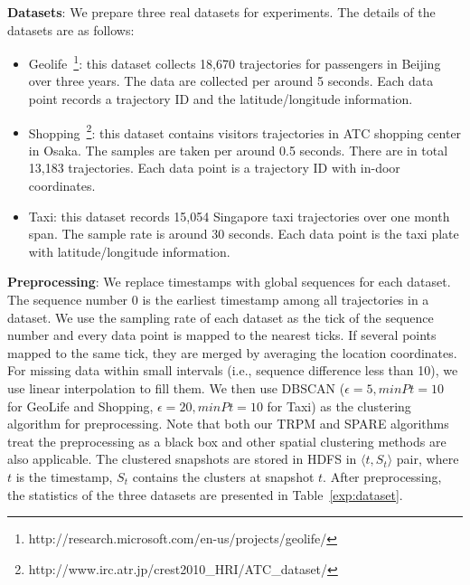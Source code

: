 \textbf{Datasets}: We prepare three real datasets for experiments. The details of the datasets are as follows:
\begin{itemize}
\item{Geolife}~\footnote{http://research.microsoft.com/en-us/projects/geolife/}: this dataset collects 
18,670 trajectories for passengers in Beijing over three years. The data are collected
per around 5 seconds. Each data point records a trajectory ID and the latitude/longitude information.
\item{Shopping}~\footnote{http://www.irc.atr.jp/crest2010\_HRI/ATC\_dataset/}: this dataset contains
 visitors trajectories in ATC shopping center in Osaka. The samples are taken per
 around 0.5 seconds. There are in total 13,183 trajectories. Each data point is a 
 trajectory ID with in-door coordinates.
\item{Taxi}: this dataset records 15,054 Singapore taxi trajectories over one month span. The sample 
rate is around 30 seconds. Each data point is the taxi plate with latitude/longitude information.
\end{itemize}

\textbf{Preprocessing}: We replace timestamps with global sequences for each dataset. The sequence number
$0$ is the earliest timestamp among all trajectories in a dataset. We use the sampling rate of 
each dataset as the tick of the sequence number and every data point is mapped to the nearest ticks. If
several points mapped to the same tick, they are merged by averaging the location coordinates.
For missing data within small intervals (i.e., sequence difference less than 10), 
we use linear interpolation to fill them. 
We then use DBSCAN ($\epsilon=5, minPt=10$ for GeoLife and Shopping, $\epsilon=20, minPt=10$ for Taxi)
as the clustering algorithm for preprocessing.  
Note that both our TRPM and SPARE algorithms treat the preprocessing as a black box and other
spatial clustering methods are also applicable. The clustered snapshots are stored in HDFS in $\langle t, S_t \rangle$ pair, where
$t$ is the timestamp, $S_t$ contains the clusters at snapshot $t$. 
After preprocessing, the statistics of the three datasets are presented in Table~\ref{exp:dataset}. 

